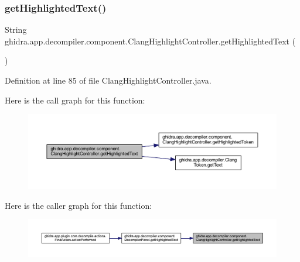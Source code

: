 \subsubsection{\texorpdfstring{getHighlightedText()}{getHighlightedText()}}
{\footnotesize\ttfamily String ghidra.\+app.\+decompiler.\+component.\+Clang\+Highlight\+Controller.\+get\+Highlighted\+Text (\begin{DoxyParamCaption}{ }\end{DoxyParamCaption})\hspace{0.3cm}{\ttfamily [inline]}}



Definition at line 85 of file Clang\+Highlight\+Controller.\+java.

Here is the call graph for this function\+:
\nopagebreak
\begin{figure}[H]
\begin{center}
\leavevmode
\includegraphics[width=350pt]{classghidra_1_1app_1_1decompiler_1_1component_1_1_clang_highlight_controller_aa9dfe1defeb71f044949dc05e557ad62_cgraph}
\end{center}
\end{figure}
Here is the caller graph for this function\+:
\nopagebreak
\begin{figure}[H]
\begin{center}
\leavevmode
\includegraphics[width=350pt]{classghidra_1_1app_1_1decompiler_1_1component_1_1_clang_highlight_controller_aa9dfe1defeb71f044949dc05e557ad62_icgraph}
\end{center}
\end{figure}
\mbox{\label{classghidra_1_1app_1_1decompiler_1_1component_1_1_clang_highlight_controller_ad3cddab4e55065b1704d6ecd191a553f}} 

